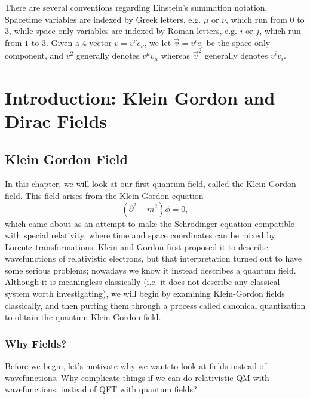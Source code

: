 \documentclass{report}
\theoremstyle{plain}
\theoremstyle{definition}
\theoremstyle{remark}
\begin{document}
There are several conventions regarding Einstein's summation notation.
Spacetime variables are indexed by Greek letters, e.g. $\mu$ or $\nu$,
which run from $0$ to $3$, while space-only variables are indexed by
Roman letters, e.g. $i$ or $j$, which run from $1$ to $3$. Given a
$4$-vector $v = v^\nu e_\nu$, we let $\vec{v} = v^i e_i$ be the
space-only component, and $v^2$ generally denotes $v^\mu v_\mu$
whereas $\vec{v}^2$ generally denotes $v^i v_i$.


\chapter{Introduction: Klein Gordon and Dirac Fields}
\section{Klein Gordon Field}

In this chapter, we will look at our first quantum field, called the
Klein-Gordon field. This field arises from the Klein-Gordon equation
$$ (\partial^2 + m^2)\phi = 0, $$ which came about as an attempt to
make the Schr\"odinger equation compatible with special relativity,
where time and space coordinates can be mixed by Lorentz
transformations. Klein and Gordon first proposed it to describe
wavefunctions of relativistic electrons, but that interpretation
turned out to have some serious problems; nowadays we know it instead
describes a quantum field. Although it is meaningless classically
(i.e. it does not describe any classical system worth investigating),
we will begin by examining Klein-Gordon fields classically, and then
putting them through a process called canonical quantization to obtain
the quantum Klein-Gordon field.

\subsection{Why Fields?}

Before we begin, let's motivate why we want to look at fields instead
of wavefunctions. Why complicate things if we can do relativistic QM
with wavefunctions, instead of QFT with quantum fields?

\end{document}
